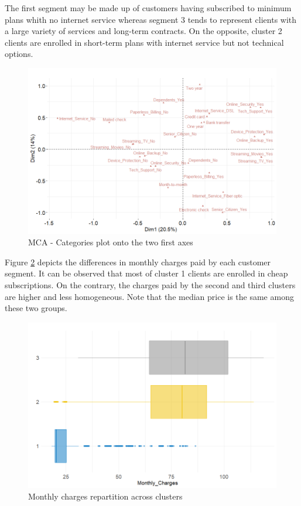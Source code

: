 \documentclass[
]{book}
\begin{document}
The first segment may be made up of customers having subscribed to minimum plans whith no internet service whereas segment 3 tends to represent clients with a large variety of services and long-term contracts. On the opposite, cluster 2 clients are enrolled in short-term plans with internet service but not technical options.

\begin{figure}

{\centering \includegraphics[width=12.5in]{./imgs/mca_plots} 

}

\caption{MCA - Categories plot onto the two first axes}\label{fig:mcaplot}
\end{figure}

Figure \ref{fig:monthlychargesclust} depicts the differences in monthly charges paid by each customer segment. It can be observed that most of cluster 1 clients are enrolled in cheap subscriptions. On the contrary, the charges paid by the second and third clusters are higher and less homogeneous. Note that the median price is the same among these two groups.

\begin{figure}

{\centering \includegraphics[width=0.7\linewidth,height=0.6\textheight]{./imgs/monthly_charges_clust} 

}

\caption{Monthly charges repartition across clusters}\label{fig:monthlychargesclust}
\end{figure}
\end{document}
